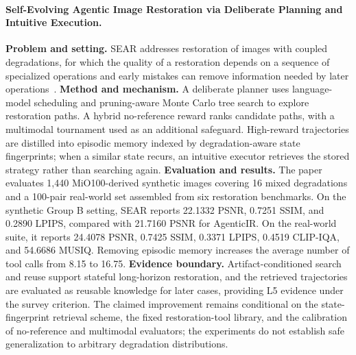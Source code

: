 \paragraph{Self-Evolving Agentic Image Restoration via Deliberate Planning and Intuitive Execution.}
\textbf{Problem and setting.} SEAR addresses restoration of images with coupled degradations, for which the quality of a restoration depends on a sequence of specialized operations and early mistakes can remove information needed by later operations~\cite{avg260628971}. \textbf{Method and mechanism.} A deliberate planner uses language-model scheduling and pruning-aware Monte Carlo tree search to explore restoration paths. A hybrid no-reference reward ranks candidate paths, with a multimodal tournament used as an additional safeguard. High-reward trajectories are distilled into episodic memory indexed by degradation-aware state fingerprints; when a similar state recurs, an intuitive executor retrieves the stored strategy rather than searching again. \textbf{Evaluation and results.} The paper evaluates 1,440 MiO100-derived synthetic images covering 16 mixed degradations and a 100-pair real-world set assembled from six restoration benchmarks. On the synthetic Group B setting, SEAR reports 22.1332 PSNR, 0.7251 SSIM, and 0.2890 LPIPS, compared with 21.7160 PSNR for AgenticIR. On the real-world suite, it reports 24.4078 PSNR, 0.7425 SSIM, 0.3371 LPIPS, 0.4519 CLIP-IQA, and 54.6686 MUSIQ. Removing episodic memory increases the average number of tool calls from 8.15 to 16.75. \textbf{Evidence boundary.} Artifact-conditioned search and reuse support stateful long-horizon restoration, and the retrieved trajectories are evaluated as reusable knowledge for later cases, providing L5 evidence under the survey criterion. The claimed improvement remains conditional on the state-fingerprint retrieval scheme, the fixed restoration-tool library, and the calibration of no-reference and multimodal evaluators; the experiments do not establish safe generalization to arbitrary degradation distributions.

